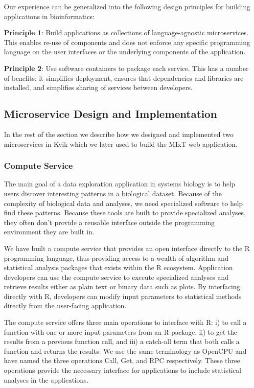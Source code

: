 Our experience can be generalized into the following design principles for
building applications in bioinformatics: 

\textbf{Principle 1}: Build applications as collections of language-agnostic
microservices. This enables re-use of components and does not enforce any
specific programming language on the user interfaces or the underlying
components of the application. 

\textbf{Principle 2}: Use software containers to package each service. This has
a number of benefits: it simplifies deployment, ensures that dependencies and
libraries are installed, and  simplifies sharing of services between
developers. 

\subsection*{Microservice Design and Implementation}
In the rest of the section we describe how we designed and implemented two
microservices in Kvik\cite{fjukstad2015kvik} which we later used to build the
MIxT web application.

\subsubsection*{Compute Service}
The main goal of a data exploration application in systems biology is to help
users discover interesting patterns in a biological dataset. Because of the
complexity of biological data and analyses, we need specialized software to help
find these patterns.  Because these tools are built to provide specialized
analyses, they often don't provide a reusable interface outside the programming
environment they are built in. 

We have built a compute service that provides an open interface directly to the
R programming language, thus providing access to a wealth of algorithm and
statistical analysis packages that exists within the R ecosystem.  
Application developers can use the compute service to execute specialized
analyses and retrieve results either as plain text or binary data such as plots.
By interfacing directly with R, developers can modify input parameters to
statistical methods directly from the user-facing application. 

The compute service offers three main operations to interface with R: i) to call
a function with one or more input parameters from an R package, ii) to get the
results from a previous function call, and iii) a catch-all term that both calls
a function and returns the results.  We use the same terminology as
OpenCPU\cite{opencpu} and have named the three operations Call, Get, and RPC
respectively. These three operations provide the necessary interface for
applications to include statistical analyses in the applications.

